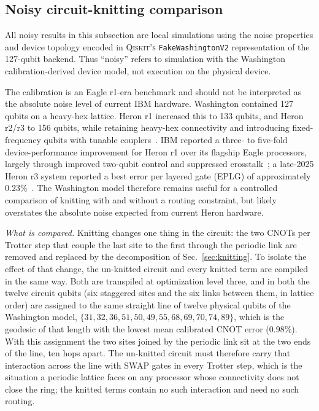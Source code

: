 \subsection{Noisy circuit-knitting comparison}
\label{sec:noisy-knitting}

All noisy results in this subsection are local simulations using the noise
properties and device topology encoded in
\textsc{Qiskit's} \texttt{FakeWashingtonV2} representation of the 127-qubit
\washington{} backend.  Thus ``noisy'' refers to simulation with the
Washington calibration-derived device model, not execution on the physical
device.

The \washington{} calibration is an Eagle r1-era benchmark and should not be
interpreted as the absolute noise level of current IBM hardware.  Washington
contained 127 qubits on a heavy-hex lattice.  Heron r1 increased this to 133
qubits, and Heron r2/r3 to 156 qubits, while retaining heavy-hex connectivity
and introducing fixed-frequency qubits with tunable
couplers~\cite{ibm-processor-types}.  IBM reported a
three- to five-fold device-performance improvement for Heron r1 over its
flagship Eagle processors, largely through improved two-qubit control and
suppressed crosstalk~\cite{ibm-heron-system-two}; a late-2025 Heron r3 system
reported a best error per layered gate (EPLG) of approximately
$0.23\%$~\cite{ibm-q4-2025}.  The Washington model therefore remains useful
for a controlled comparison of knitting with and without a routing
constraint, but likely overstates the absolute noise expected from current
Heron hardware.

\noindent\textit{What is compared.}\quad
Knitting changes one thing in the circuit: the two CNOTs per Trotter step
that couple the last site to the first through the periodic link are removed
and replaced by the decomposition of Sec.~\ref{sec:knitting}.  To isolate the
effect of that change, the un-knitted circuit and every knitted term are
compiled in the same way.  Both are transpiled at optimization level three,
and in both the twelve circuit qubits (six staggered sites and the six links
between them, in lattice order) are assigned to the same straight line of
twelve physical qubits of the Washington model,
$\{31,32,36,51,50,49,55,68,69,70,74,89\}$, which is the geodesic of that
length with the lowest mean calibrated CNOT error ($0.98\%$).  With this
assignment the two sites joined by the periodic link sit at the two ends of
the line, ten hops apart.  The un-knitted circuit must therefore carry that
interaction across the line with SWAP gates in every Trotter step, which is
the situation a periodic lattice faces on any processor whose connectivity
does not close the ring; the knitted terms contain no such interaction and
need no such routing.

